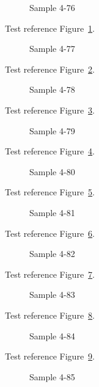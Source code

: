 \begin{figure}[tbhp]
\caption{Sample 4-76}
\label{fig:sample-4-76}
\end{figure}

Test reference Figure~\ref{fig:sample-4-76}.

\begin{figure}[tbhp]
\caption{Sample 4-77}
\label{fig:sample-4-77}
\end{figure}

Test reference Figure~\ref{fig:sample-4-77}.

\begin{figure}[tbhp]
\caption{Sample 4-78}
\label{fig:sample-4-78}
\end{figure}

Test reference Figure~\ref{fig:sample-4-78}.

\begin{figure}[tbhp]
\caption{Sample 4-79}
\label{fig:sample-4-79}
\end{figure}

Test reference Figure~\ref{fig:sample-4-79}.

\begin{figure}[tbhp]
\caption{Sample 4-80}
\label{fig:sample-4-80}
\end{figure}

Test reference Figure~\ref{fig:sample-4-80}.

\begin{figure}[tbhp]
\caption{Sample 4-81}
\label{fig:sample-4-81}
\end{figure}

Test reference Figure~\ref{fig:sample-4-81}.

\begin{figure}[tbhp]
\caption{Sample 4-82}
\label{fig:sample-4-82}
\end{figure}

Test reference Figure~\ref{fig:sample-4-82}.

\begin{figure}[tbhp]
\caption{Sample 4-83}
\label{fig:sample-4-83}
\end{figure}

Test reference Figure~\ref{fig:sample-4-83}.

\begin{figure}[tbhp]
\caption{Sample 4-84}
\label{fig:sample-4-84}
\end{figure}

Test reference Figure~\ref{fig:sample-4-84}.

\begin{figure}[tbhp]
\caption{Sample 4-85}
\label{fig:sample-4-85}
\end{figure}


